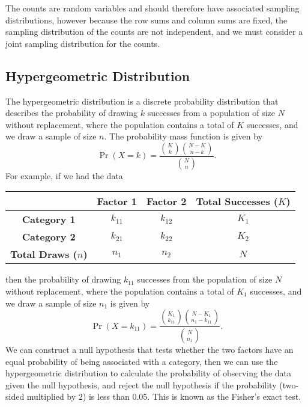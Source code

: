 \documentclass{article}
\begin{document}
The counts are random variables and should therefore have associated sampling distributions, however because the row sums
and column sums are fixed, the sampling distribution of the counts are not independent, and we must consider a joint
sampling distribution for the counts.
\subsection{Hypergeometric Distribution}
The hypergeometric distribution is a discrete probability distribution that describes the probability of drawing
\(k\) successes from a population of size \(N\) without replacement, where the population contains a total of
\(K\) successes, and we draw a sample of size \(n\).
The probability mass function is given by
\begin{equation*}
    \Pr{\left( X = k \right)} = \frac{\binom{K}{k} \binom{N - K}{n - k}}{\binom{N}{n}}.
\end{equation*}
For example, if we had the data
\begin{table}[H]
    \centering
    \begin{tabular}{c c c c}
        \toprule
                                     & \textbf{Factor 1} & \textbf{Factor 2} & \textbf{Total Successes (\(K\))} \\
        \midrule
        \textbf{Category 1}          & \(k_{11}\)        & \(k_{12}\)        & \(K_1\)                          \\
        \textbf{Category 2}          & \(k_{21}\)        & \(k_{22}\)        & \(K_2\)                          \\
        \textbf{Total Draws (\(n\))} & \(n_1\)           & \(n_2\)           & \(N\)                            \\
        \bottomrule
    \end{tabular}
\end{table}
then the probability of drawing \(k_{11}\) successes from the population of size \(N\) without replacement, where the population contains a total of
\(K_1\) successes, and we draw a sample of size \(n_1\) is given by
\begin{equation*}
    \Pr{\left( X = k_{11} \right)} = \frac{\binom{K_1}{k_{11}} \binom{N - K_1}{n_1 - k_{11}}}{\binom{N}{n_1}}.
\end{equation*}
We can construct a null hypothesis that tests whether the two factors have an equal probability of being
associated with a category, then we can use the hypergeometric distribution to calculate the probability of
observing the data given the null hypothesis, and reject the null hypothesis if the probability (two-sided multiplied by 2)
is less than 0.05. This is known as the Fisher's exact test.
\end{document}
